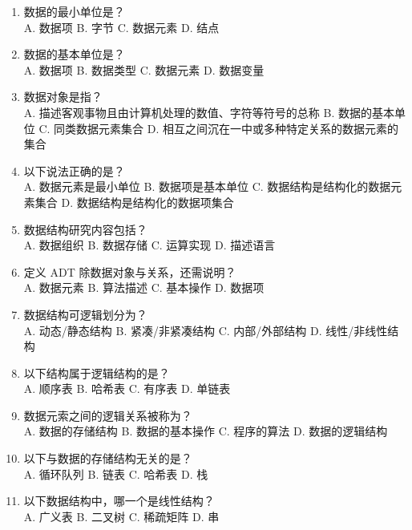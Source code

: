 \documentclass[lang=cn,newtx,10pt,scheme=chinese]{elegantbook}
\begin{document}
\begin{enumerate}
    \item 数据的最小单位是？\\
    A. 数据项 \quad B. 字节 \quad C. 数据元素 \quad D. 结点

    \item 数据的基本单位是？\\
    A. 数据项 \quad B. 数据类型 \quad C. 数据元素 \quad D. 数据变量

    \item 数据对象是指？\\
    A. 描述客观事物且由计算机处理的数值、字符等符号的总称 \quad 
    B. 数据的基本单位
    C. 同类数据元素集合
    D. 相互之间沉在一中或多种特定关系的数据元素的集合

    \item 以下说法正确的是？\\
    A. 数据元素是最小单位 \quad B. 数据项是基本单位
    \quad C. 数据结构是结构化的数据元素集合 \quad D. 数据结构是结构化的数据项集合

    \item 数据结构研究内容包括？\\
    A. 数据组织 \quad B. 数据存储 \quad C. 运算实现 \quad D. 描述语言

    \item 定义 ADT 除数据对象与关系，还需说明？\\
    A. 数据元素 \quad B. 算法描述 \quad C. 基本操作 \quad D. 数据项

    \item 数据结构可逻辑划分为？\\
    A. 动态/静态结构 \quad B. 紧凑/非紧凑结构
    \quad C. 内部/外部结构 \quad D. 线性/非线性结构

    \item 以下结构属于逻辑结构的是？\\
    A. 顺序表 \quad B. 哈希表 \quad C. 有序表 \quad D. 单链表

    \item 数据元索之间的逻辑关系被称为？\\
    A. 数据的存储结构 \quad B. 数据的基本操作 \quad C. 程序的算法 \quad D. 数据的逻辑结构

    \item 以下与数据的存储结构无关的是？\\
    A. 循环队列 \quad B. 链表 \quad C. 哈希表 \quad D. 栈

    \item 以下数据结构中，哪一个是线性结构？\\
    A. 广义表 \quad B. 二叉树 \quad C. 稀疏矩阵 \quad D. 串


\end{enumerate}
\end{document}
